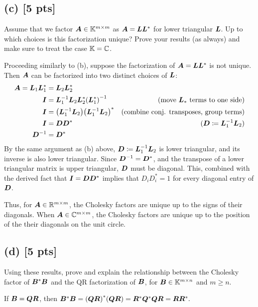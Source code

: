 \documentclass[twoside,10pt]{article}
\begin{document}
\subsection*{(c) [5 pts]}
Assume that we factor $\bm{A} \in \mathbb{K}^{m \times m}$ as $\bm{A} = \bm{L} \bm{L}^{*}$ for lower triangular $\bm{L}$.  
Up to which choices is this factorization unique? 
Prove your results (as always) and make sure to treat the case $\mathbb{K} = \mathbb{C}$. 

Proceeding similarly to (b), suppose the factorization of $\bm{A} = \bm{L} \bm{L}^{*}$ is not unique.
Then $\bm{A}$ can be factorized into two distinct choices of $\bm{L}$:
\begin{align*}
\mtx{A} = \mtx{L}_1\mtx{L}_1^{*} &= \mtx{L}_2\mtx{L}_2^{*}\\
\mtx{I} &= \mtx{L}_1^{-1}\mtx{L}_2\mtx{L}_2^{*}\left(\mtx{L}_1^{*}\right)^{-1} &\text{(move $\mtx{L}_{*}$ terms to one side)}\\
\mtx{I} &= \left(\mtx{L}_1^{-1}\mtx{L}_2\right)\left(\mtx{L}_1^{-1}\mtx{L}_2\right)^{*} &\text{(combine conj. transposes, group terms)}\\
\mtx{I} &= \mtx{D}\mtx{D}^{*} &\text{($\mtx{D} \coloneqq \mtx{L}_1^{-1}\mtx{L}_2$)}\\
\mtx{D}^{-1} &= \mtx{D}^{*}\\
\end{align*}
By the same argument as (b) above, $\bm{D} \coloneqq \bm{L}_1^{-1}\bm{L}_2$ is lower triangular, and its inverse is also lower triangular.
Since $\bm{D}^{-1} = \bm{D}^{*}$, and the transpose of a lower triangular matrix is upper triangular, $\bm{D}$ must be diagonal.
This, combined with the derived fact that $\bm{I} = \bm{D}\bm{D}^{*}$ implies that $D_{i}D_{i}^{*} = 1$ for every diagonal entry of $\bm{D}$.

Thus, for $\bm{A} \in \mathbb{R}^{m \times m}$, the Cholesky factors are unique up to the signs of their diagonals.
When $\bm{A} \in \mathbb{C}^{m \times m}$, the Cholesky factors are unique up to the position of the their diagonals on the unit circle.

\subsection*{(d) [5 pts]} 
Using these results, prove and explain the relationship between the Cholesky factor of $\bm{B}^* \bm{B}$ and the QR factorization of $\bm{B}$, for $\bm{B} \in \mathbb{K}^{m \times n}$ and $m \geq n$.

If $\bm{B} = \bm{Q}\bm{R}$, then $\mtx{B}^{*}\mtx{B}= \left(\mtx{Q}\mtx{R}\right)^{*}\left(\mtx{Q}\mtx{R}\right) = \mtx{R}^{*}\mtx{Q}^{*}\mtx{Q}\mtx{R}= \mtx{R}\mtx{R}^{*}.$
\end{document}
